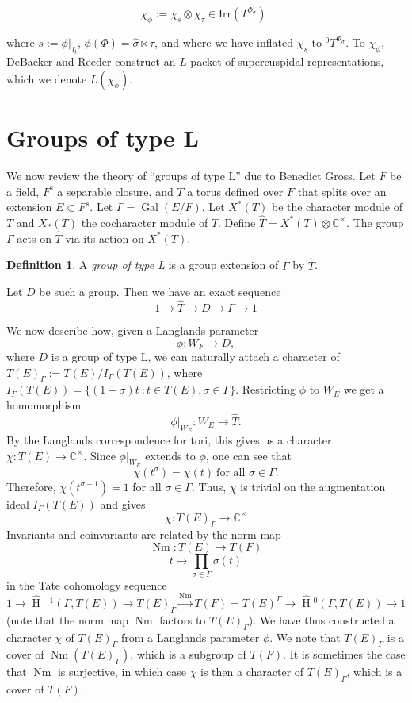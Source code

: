 \documentclass[11pt]{amsart}
\theoremstyle{plain}
\newcommand{\HT}[1]{\hat{\HH}{}^{#1}}
\theoremstyle{definition}
\newtheorem{definition}[theorem]{Definition}
\DeclareMathOperator{\Gal}{Gal}
\DeclareMathOperator{\HH}{H}
\DeclareMathOperator{\Nm}{Nm}
\begin{document}
\begin{equation}
\chi_{\phi} := \chi_s \otimes \chi_{\tau} \in \mathrm{Irr}(T^{\Phi_{\sigma}}) \ \ \label{chitau}
\end{equation}

\noindent where $s := \phi|_{I_t}$, $\phi(\Phi) = \hat{\sigma} \ltimes \tau$,
and where we have inflated $\chi_s$ to ${}^0 T^{\Phi_{\sigma}}$.  To
$\chi_{\phi}$, DeBacker and Reeder construct an $L$-packet of
supercuspidal representations, which we denote $L(\chi_{\phi})$.

\section{Groups of type L}\label{groupsoftypeL}
We now review the theory of ``groups of type L'' due to Benedict
Gross.  Let $F$ be a field, $F^{\mathrm s}$ a separable closure, and
$T$ a torus defined over $F$ that splits over an extension $E \subset
F^s$.  Let $\Gamma = \Gal(E/F)$.  Let $X^*(T)$ be the character module
of $T$ and $X_*(T)$ the cocharacter module of $T$.  Define
$\hat{T} = X^*(T) \otimes \mathbb{C}^\times$.  The group $\Gamma$ acts on
$\hat{T}$ via its action on $X^*(T)$.

\begin{definition}
A \emph{group of type L} is a group extension of $\Gamma$ by $\hat{T}$.
\end{definition}

Let $D$ be such a group.  Then we have an exact sequence
$$1 \rightarrow \hat{T} \rightarrow D \rightarrow \Gamma \rightarrow 1$$

We now describe how, given a Langlands parameter
$$\phi : W_F \rightarrow D,$$
where $D$ is a group of type L, we can naturally attach a character of
$T(E)_{\Gamma} := T(E) / I_{\Gamma}(T(E))$, where
$I_{\Gamma}(T(E)) = \{(1 - \sigma)t \ : t \in T(E), \sigma \in \Gamma \}$.
Restricting $\phi$ to $W_E$ we get a homomorphism
$$\phi|_{W_E} : W_E \rightarrow \hat{T}.$$
By the Langlands correspondence for tori, this gives us a character
$\chi : T(E) \rightarrow \mathbb{C}^\times$.  Since $\phi|_{W_E}$ extends
to $\phi$, one can see that
$$\chi(t^{\sigma}) = \chi(t)\ \mbox{for all $\sigma \in \Gamma$.}$$
Therefore, $\chi(t^{\sigma - 1}) = 1$ for all $\sigma \in \Gamma$.
Thus, $\chi$ is trivial on the augmentation ideal $I_{\Gamma}(T(E))$
and gives $$\chi : T(E)_\Gamma \rightarrow \mathbb{C}^\times$$ Invariants
and coinvariants are related by the norm map
$$\Nm : T(E) \rightarrow T(F)$$ $$t \mapsto \displaystyle\prod_{\sigma \in \Gamma} \sigma(t)$$
in the Tate cohomology sequence
$$1 \rightarrow \HT{-1}(\Gamma,T(E)) \rightarrow T(E)_{\Gamma} \xrightarrow{\Nm} T(F)
  = T(E)^{\Gamma} \rightarrow \HT{0}(\Gamma,T(E)) \rightarrow 1$$
(note that the norm map $\Nm$ factors to $T(E)_{\Gamma}$).
We have thus constructed a character $\chi$ of $T(E)_{\Gamma}$ from a
Langlands parameter $\phi$. We note that $T(E)_{\Gamma}$ is a cover of
$\Nm(T(E)_{\Gamma})$, which is a subgroup of $T(F)$.  It is sometimes
the case that $\Nm$ is surjective, in which case $\chi$ is then a
character of $T(E)_{\Gamma}$, which is a cover of $T(F)$.
\end{document}
